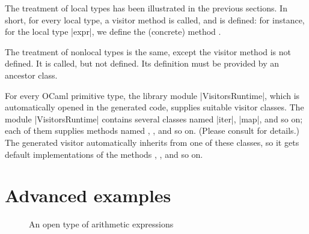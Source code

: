 \documentclass[11pt,a4paper,twoside]{article}
\begin{document}
The treatment of local types has been illustrated in the previous sections. In
short, for every local type, a visitor method is called, and is defined:
for instance, for the local type \oc|expr|, we define the (concrete) method
.

The treatment of nonlocal types is the same, except the visitor method is not
defined. It is called, but not defined. Its definition must be provided by an
ancestor class.



For every OCaml primitive type, the library module \oc|VisitorsRuntime|, which
is automatically opened in the generated code, supplies suitable visitor
classes. The module \oc|VisitorsRuntime| contains several classes named
\oc|iter|, \oc|map|, and so on; each of them supplies methods named
, , and so on. (Please consult
   for details.) The generated visitor
automatically inherits from one of these classes, so it gets default
implementations of the methods , ,
and so on.



\section{Advanced examples}
\label{sec:advanced}


\begin{figure}[p]
\vspace{-\baselineskip}
\caption{An open type of arithmetic expressions} %
\label{fig:expr12}
\end{figure}
\end{document}
